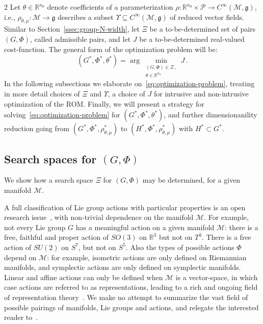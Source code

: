\documentclass{article}
\newcommand{\M}{\mathcal{M}}                                %
\newcommand{\g}{\mathfrak{g}}                               %
\newcommand{\R}{\mathbb{R}}                                 %
\begin{document}
\begin{multicols}{2}
Let $\theta \in \R^{n_\theta}$ denote coefficients of a parameterization $\rho:\R^{n_\theta}\times\mathcal{P}\rightarrow C^\infty(\M,\g)$, i.e., $\rho_{\theta,\mu}:\M\rightarrow\g$ describes a subset $\Upsilon\subseteq C^\infty(\M,\g)$ of reduced vector fields. Similar to Section~\ref{ssec:group-N-width}, let $\Xi$ be a to-be-determined set of pairs $(G,\Phi)$, called admissible pairs, and let $J$ be a to-be-determined real-valued cost-function. The general form of the optimization problem will be:
\begin{equation}\label{eq:optimization-problem}
    (G^*,\Phi^*,\theta^*) = \arg\min_{\substack{(G,\Phi)\in\Xi\,, \\ \theta \in \R^{n_\theta}}} J\,. %
\end{equation}
In the following subsections we elaborate on~\eqref{eq:optimization-problem}, treating in more detail choices of $\Xi$ and $\Upsilon$, a choice of $J$ for intrusive and non-intrusive optimization of the ROM. Finally, we will present a strategy for solving~\eqref{eq:optimization-problem} for $(G^*,\Phi^*,\theta^*)$, and further dimensionanility reduction going from $(G^*,\Phi^*,\rho_{\theta,\mu}^*)$ to $(H^*,\Phi^*,\rho_{\theta,\mu}^*)$ with $H^*\subset G^*$. %

\subsection{Search spaces for $(G,\Phi)$} %
We show how a search space $\Xi$ for $(G,\Phi)$ may be determined, for a given manifold $\M$.

A full classification of Lie group actions with particular properties is an open research issue~\cite{Hirsch2011}, with non-trivial dependence on the manifold $\M$.
For example, not every Lie group $G$ has a meaningful action on a given manifold $\M$: there is a free, faithful and proper action of $SO(3)$ on $\R^3$ but not on $T^3$. There is a free action of $SU(2)$ on $S^7$, but not on $S^5$. Also the types of possible actions $\Phi$ depend on $\M$: for example, isometric actions are only defined on Riemannian manifolds, and symplectic actions are only defined on symplectic manifolds. Linear and affine actions can only be defined when $\M$ is a vector-space, in which case actions are referred to as representations, leading to a rich and ongoing field of representation theory~\cite{Hall2015}.
We make no attempt to summarize the vast field of possible pairings of manifolds, Lie groups and actions, and relegate the interested reader to~\cite{Hirsch2011,Hall2015,Knapp1996}. 


\end{multicols}
\end{document}
